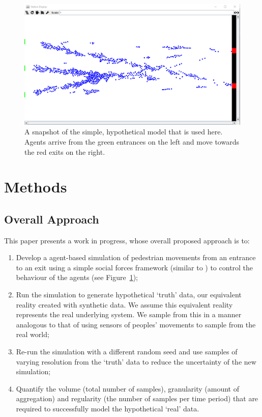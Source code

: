 \documentclass[runningheads]{llncs}
\begin{document}
\begin{figure}
\includegraphics[width=\textwidth]{figures/pedestrian_model_environment}
\caption{A snapshot of the simple, hypothetical model that is used here. Agents arrive from the green entrances on the left and move towards the red exits on the right.} \label{fig:pedestrian_model_environment}
\end{figure}

\section{Methods}

\subsection{Overall Approach}

This paper presents a work in progress, whose overall proposed approach is to:

\begin{enumerate}
\item Develop a  agent-based simulation of pedestrian movements from an entrance to an exit using a simple social forces framework (similar to \cite{helbing_social_1995}) to control the behaviour of the agents (see Figure~\ref{fig:pedestrian_model_environment});
\item Run the simulation to generate hypothetical `truth' data, our equivalent reality created with synthetic data. We assume this equivalent reality represents the real underlying system.  We sample from this in a manner analogous to that of using sensors of peoples' movements to sample from the real world;
\item \label{objectives:current} Re-run the simulation with a different random seed and use samples of varying resolution from the `truth' data to reduce the uncertainty of the new simulation;
\item \label{objectives:da} Quantify the volume (total number of samples), granularity (amount of aggregation) and regularity (the number of samples per time period) that are required to successfully model the hypothetical `real' data.
\end{enumerate}
\end{document}
